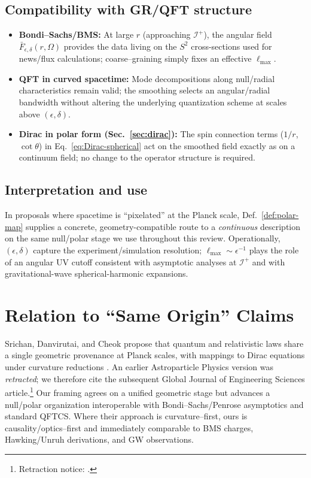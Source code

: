 \documentclass[12pt]{article}
\newcommand{\Iplus}{\mathcal{I}^+}
\begin{document}
\subsection{Compatibility with GR/QFT structure}
\begin{itemize}[leftmargin=1.2em]
\item \textbf{Bondi--Sachs/BMS:} At large $r$ (approaching $\Iplus$), the angular field 
$\bar F_{\epsilon,\delta}(r,\Omega)$ provides the data living on the $S^2$ cross-sections used for 
news/flux calculations; coarse--graining simply fixes an effective $\ell_{\max}$.
\item \textbf{QFT in curved spacetime:} Mode decompositions along null/radial characteristics 
remain valid; the smoothing selects an angular/radial bandwidth without altering the underlying 
quantization scheme at scales above $(\epsilon,\delta)$.
\item \textbf{Dirac in polar form (Sec.~\ref{sec:dirac}):} The spin connection terms 
($1/r$, $\cot\theta$) in Eq.~\eqref{eq:Dirac-spherical} act on the smoothed field exactly as on a 
continuum field; no change to the operator structure is required.
\end{itemize}

\subsection{Interpretation and use}
In proposals where spacetime is ``pixelated'' at the Planck scale, 
Def.~\ref{def:polar-map} supplies a concrete, geometry-compatible route to a 
\emph{continuous} description on the same null/polar stage we use throughout this review. 
Operationally, $(\epsilon,\delta)$ capture the experiment/simulation resolution; 
$\ell_{\max}\!\sim\! \epsilon^{-1}$ plays the role of an angular UV cutoff consistent with 
asymptotic analyses at $\Iplus$ and with gravitational-wave spherical-harmonic expansions.

\section{Relation to ``Same Origin'' Claims}\label{sec:same-origin}
Srichan, Danvirutai, and Cheok propose that quantum and relativistic laws share a single geometric provenance at Planck scales, with mappings to Dirac equations under curvature reductions \citep{SrichanGJES2025}. An earlier Astroparticle Physics version was \emph{retracted}; we therefore cite the subsequent Global Journal of Engineering Sciences article.\footnote{Retraction notice: \citet{SrichanRetraction2025}.} Our framing agrees on a unified geometric stage but advances a null/polar organization interoperable with Bondi--Sachs/Penrose asymptotics and standard QFTCS. Where their approach is curvature–first, ours is causality/optics–first and immediately comparable to BMS charges, Hawking/Unruh derivations, and GW observations.
\end{document}
